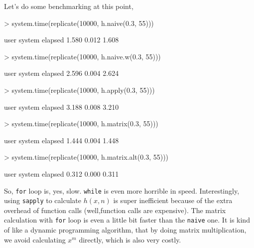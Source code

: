 \documentclass{article}
\begin{document}
Let's do some benchmarking at this point,
\begin{Schunk}
\begin{Sinput}
> system.time(replicate(10000, h.naive(0.3, 55)))
\end{Sinput}
\begin{Soutput}
   user  system elapsed 
  1.580   0.012   1.608 
\end{Soutput}
\begin{Sinput}
> system.time(replicate(10000, h.naive.w(0.3, 55)))
\end{Sinput}
\begin{Soutput}
   user  system elapsed 
  2.596   0.004   2.624 
\end{Soutput}
\begin{Sinput}
> system.time(replicate(10000, h.apply(0.3, 55)))
\end{Sinput}
\begin{Soutput}
   user  system elapsed 
  3.188   0.008   3.210 
\end{Soutput}
\begin{Sinput}
> system.time(replicate(10000, h.matrix(0.3, 55)))
\end{Sinput}
\begin{Soutput}
   user  system elapsed 
  1.444   0.004   1.448 
\end{Soutput}
\begin{Sinput}
> system.time(replicate(10000, h.matrix.alt(0.3, 55)))
\end{Sinput}
\begin{Soutput}
   user  system elapsed 
  0.312   0.000   0.311 
\end{Soutput}
\end{Schunk}

So, \verb=for= loop is, yes, slow. \verb=while= is even more horrible in speed. Interestingly, using \verb=sapply= to calculate $h(x,n)$ is super inefficient because of the extra overhead of function calls (well,function calls are expensive). The matrix calculation with \verb=for= loop is even a little bit faster than the \verb=naive= one. It is kind of like a dynamic programming algorithm, that by doing matrix multiplication, we avoid calculating $x^m$ directly, which is also very costly.
\end{document}
